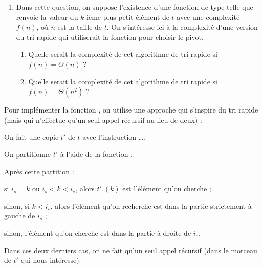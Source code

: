 \documentclass[a4paper,french,bookmarks]{article}
\begin{document}
\begin{enumerate}
    \item Dans cette question, on suppose l’existence d’une fonction  de type  telle que  renvoie la valeur du $k$-ième plus petit élément de $t$ avec une complexité $f(n)$, où $n$ est la taille de $t$. On s’intéresse ici à la complexité d’une version du tri rapide qui utiliserait la fonction  pour choisir le pivot.
    
    \begin{enumerate}
        \item  Quelle serait la complexité de cet algorithme de tri rapide si $f(n) = \Theta(n)$ ?
        
        
        \item\label{question2:1b} Quelle serait la complexité de cet algorithme de tri rapide si $f(n) = \Theta(n^2)$ ?
        
    \end{enumerate}
\end{enumerate}

Pour implémenter la fonction , on utilise une approche qui s’inspire du tri rapide (mais qui n’effectue qu’un seul appel récursif au lieu de deux) :

\begin{enumerate}
    \ithand On fait une copie $t'$ de $t$ avec l’instruction  \dots .
    
    \ithand On partitionne $t'$ à l’aide de la fonction  .
    
    \ithand Après cette partition :
    \begin{enumerate}
        \itstar si $i_s = k$ ou $i_s < k < i_e$, alors $t'.(k)$ est l’élément qu’on cherche ;
        
        \itstar sinon, si $k < i_s$, alors l’élément qu’on recherche est dans la partie strictement à gauche de $i_s$ ;
        
        \itstar sinon, l’élément qu’on cherche est dans la partie à droite de $i_e$.
    \end{enumerate}
    
    Dans ces deux derniers cas, on ne fait qu’un seul appel récursif (dans le morceau de $t'$ qui nous intéresse).
\end{enumerate}
\end{document}
